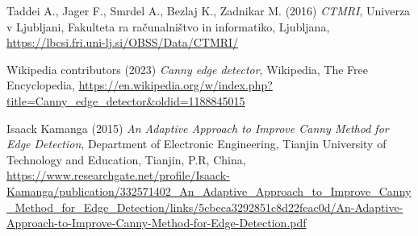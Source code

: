 \documentclass{article}
\begin{document}
    
    \begin{thebibliography}{9}
        Taddei A., Jager F., Smrdel A., Bezlaj K., Zadnikar M. (2016) \emph{CTMRI}, Univerza v Ljubljani, Fakulteta ra računalništvo in informatiko, Ljubljana, \url{https://lbcsi.fri.uni-lj.si/OBSS/Data/CTMRI/}

        Wikipedia contributors (2023) \emph{Canny edge detector}, Wikipedia, The Free Encyclopedia, \url{https://en.wikipedia.org/w/index.php?title=Canny_edge_detector&oldid=1188845015}

        Isaack Kamanga (2015) \emph{An Adaptive Approach to Improve Canny Method for Edge Detection}, Department of Electronic Engineering, Tianjin University of Technology and Education, Tianjin, P.R, China, \url{https://www.researchgate.net/profile/Isaack-Kamanga/publication/332571402_An_Adaptive_Approach_to_Improve_Canny_Method_for_Edge_Detection/links/5cbeca3292851c8d22feac0d/An-Adaptive-Approach-to-Improve-Canny-Method-for-Edge-Detection.pdf}
    \end{thebibliography}
\end{document}
